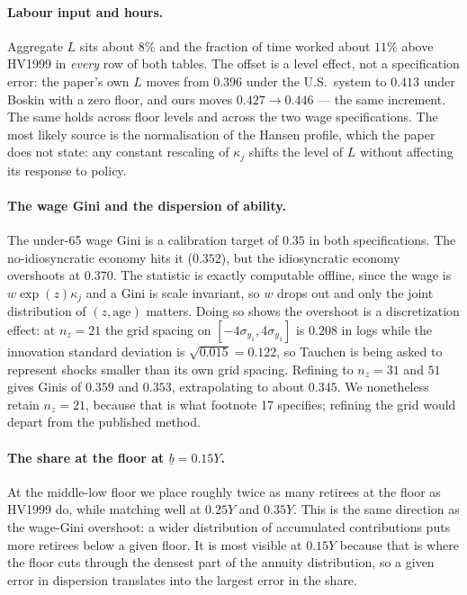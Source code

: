 \documentclass[11pt,fleqn]{article}
\begin{document}
\paragraph{Labour input and hours.} Aggregate $L$ sits about $8\%$ and the fraction of time
worked about $11\%$ above HV1999 in \emph{every} row of both tables. The offset is a level
effect, not a specification error: the paper's own $L$ moves from $0.396$ under the U.S.\
system to $0.413$ under Boskin with a zero floor, and ours moves $0.427\to0.446$ --- the same
increment. The same holds across floor levels and across the two wage specifications. The most
likely source is the normalisation of the Hansen profile, which the paper does not state: any
constant rescaling of $\kappa_j$ shifts the level of $L$ without affecting its response to
policy.

\paragraph{The wage Gini and the dispersion of ability.} The under-65 wage Gini is a
calibration target of $0.35$ in both specifications. The no-idiosyncratic economy hits it
($0.352$), but the idiosyncratic economy overshoots at $0.370$. The statistic is exactly
computable offline, since the wage is $w\exp(z)\kappa_j$ and a Gini is scale invariant, so
$w$ drops out and only the joint distribution of $(z,\text{age})$ matters. Doing so shows the
overshoot is a discretization effect: at $n_z=21$ the grid spacing on
$[-4\sigma_{y_1},4\sigma_{y_1}]$ is $0.208$ in logs while the innovation standard deviation is
$\sqrt{0.015}=0.122$, so Tauchen is being asked to represent shocks smaller than its own grid
spacing. Refining to $n_z=31$ and $51$ gives Ginis of $0.359$ and $0.353$, extrapolating to
about $0.345$. We nonetheless retain $n_z=21$, because that is what footnote 17 specifies;
refining the grid would depart from the published method.

\paragraph{The share at the floor at $\underline{b}=0.15Y$.} At the middle-low floor we place
roughly twice as many retirees at the floor as HV1999 do, while matching well at $0.25Y$ and
$0.35Y$. This is the same direction as the wage-Gini overshoot: a wider distribution of
accumulated contributions puts more retirees below a given floor. It is most visible at
$0.15Y$ because that is where the floor cuts through the densest part of the annuity
distribution, so a given error in dispersion translates into the largest error in the share.
\end{document}
